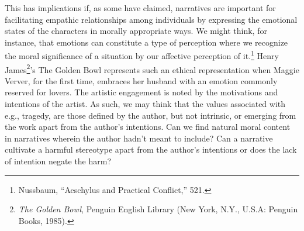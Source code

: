 \documentclass[
  12pt,
]{book}
\theoremstyle{definition}
\theoremstyle{definition}
\theoremstyle{definition}
\theoremstyle{definition}
\theoremstyle{remark}
\begin{document}
This has implications if, as some have claimed, narratives are important for facilitating empathic relationships among individuals by expressing the emotional states of the characters in morally appropriate ways. We might think, for instance, that emotions can constitute a type of perception where we recognize the moral significance of a situation by our affective perception of it.\footnote{Nussbaum, {``Aeschylus and Practical Conflict,''} 521.} Henry James\footnote{\emph{The Golden Bowl}, Penguin {English} Library (New York, N.Y., U.S.A: Penguin Books, 1985).}'s The Golden Bowl represents such an ethical representation when Maggie Verver, for the first time, embraces her husband with an emotion commonly reserved for lovers. The artistic engagement is noted by the motivations and intentions of the artist. As such, we may think that the values associated with e.g., tragedy, are those defined by the author, but not intrinsic, or emerging from the work apart from the author's intentions. Can we find natural moral content in narratives wherein the author hadn't meant to include? Can a narrative cultivate a harmful stereotype apart from the author's intentions or does the lack of intention negate the harm?
\end{document}
